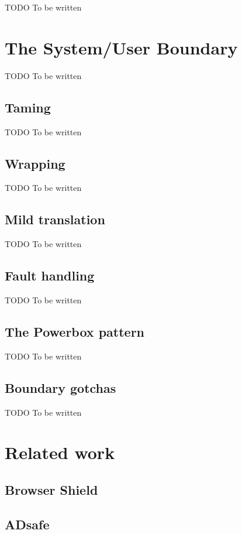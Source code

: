 \documentclass[letterpaper,twocolumn,10pt]{article}
\begin{document}
TODO To be written

\section{The System/User Boundary}
\label{sec:boundary}

TODO To be written

\subsection{Taming}

TODO To be written

\subsection{Wrapping}

TODO To be written

\subsection{Mild translation}

TODO To be written

\subsection{Fault handling}

TODO To be written

\subsection{The Powerbox pattern}

TODO To be written

\subsection{Boundary gotchas}

TODO To be written

\section{Related work}
\label{sec:related}

\subsection{Browser Shield}

\subsection{ADsafe}
\end{document}
